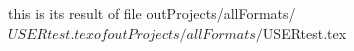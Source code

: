 this is its result of file outProjects/allFormats/$USERtest.tex of outProjects/allFormats/$USERtest.tex